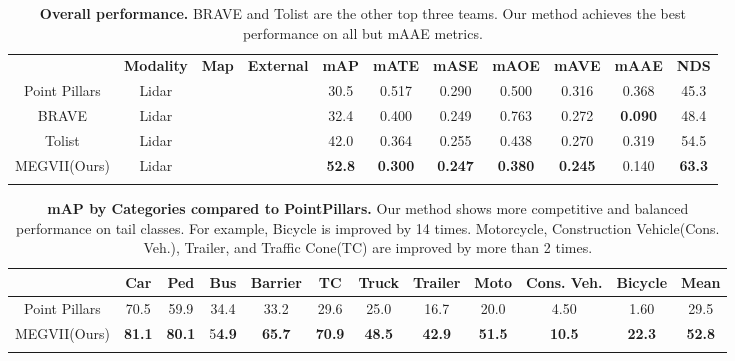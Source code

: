 \documentclass[10pt,twocolumn,letterpaper]{article}
\begin{document}
\begin{table*}[t]
    \begin{center}
    \begin{tabular} {c|c|c|c|c|c|c|c|c|c|c}
        \Xhline{0.8pt}
        & \textbf{Modality} & \textbf{Map} & \textbf{External} & \textbf{mAP} & \textbf{mATE} & \textbf{mASE} & \textbf{mAOE} & \textbf{mAVE} & \textbf{mAAE} & \textbf{NDS} \\
        \Xhline{0.8pt}
        Point Pillars \cite{pointpillars} & Lidar &  &  & 30.5 & 0.517 & 0.290 & 0.500 & 0.316 & 0.368 & 45.3 \\
        \hline
        BRAVE \cite{nusc3ddet} & Lidar &  &  &  32.4 & 0.400 & 0.249 & 0.763 & 0.272 & \textbf{0.090} & 48.4 \\
        \hline
        Tolist \cite{nusc3ddet} & Lidar &  &  & 42.0 & 0.364 & 0.255 & 0.438 & 0.270 & 0.319 & 54.5 \\
        \hline
        MEGVII(Ours) & Lidar &  &  & \textbf{52.8} & \textbf{0.300} & \textbf{0.247} & \textbf{0.380} & \textbf{0.245} & 0.140 & \textbf{63.3} \\
        \Xhline{0.8pt}
    \end{tabular}
    \end{center}
    \caption{\textbf{Overall performance.} BRAVE and Tolist are the other top three teams. Our method achieves the best performance on all but mAAE metrics.}
    \label{table:overall}
\end{table*}

\begin{table*}[t]
    \begin{center}
    \begin{tabular} {c|c|c|c|c|c|c|c|c|c|c|c}
        \Xhline{0.8pt}
        & Car & Ped & Bus & Barrier & TC & Truck & Trailer & Moto & Cons. Veh. & Bicycle & Mean \\
        \hline
        Point Pillars \cite{pointpillars} & 70.5 & 59.9 & 34.4 & 33.2 & 29.6 & 25.0 & 16.7 & 20.0 & 4.50 & 1.60 & 29.5\\
        \hline
        MEGVII(Ours) & \textbf{81.1} & \textbf{80.1} & 5\textbf{4.9} & \textbf{65.7} & \textbf{70.9} & \textbf{48.5} & \textbf{42.9} & \textbf{51.5} & \textbf{10.5} & \textbf{22.3} & \textbf{52.8} \\
        \Xhline{0.8pt}
    \end{tabular}
    \end{center}
    \label{table:percls}
    \caption{\textbf{mAP by Categories compared to PointPillars.} Our method shows more competitive and balanced performance on tail classes. For example, Bicycle is improved by 14 times. Motorcycle, Construction Vehicle(Cons. Veh.), Trailer, and Traffic Cone(TC) are improved by more than 2 times.}
\end{table*}
\end{document}
